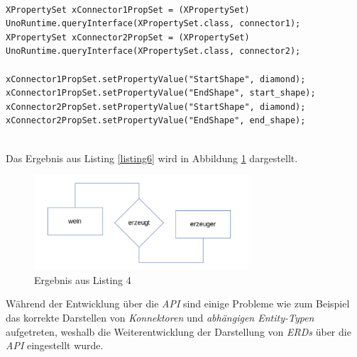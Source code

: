\noindent
\lstset{language=Java}
\lstset{frame=lines}
\lstset{basicstyle=\footnotesize}
\begin{lstlisting}

XPropertySet xConnector1PropSet = (XPropertySet) 
UnoRuntime.queryInterface(XPropertySet.class, connector1);
XPropertySet xConnector2PropSet = (XPropertySet) 
UnoRuntime.queryInterface(XPropertySet.class, connector2);

xConnector1PropSet.setPropertyValue("StartShape", diamond);
xConnector1PropSet.setPropertyValue("EndShape", start_shape);
xConnector2PropSet.setPropertyValue("StartShape", diamond);
xConnector2PropSet.setPropertyValue("EndShape", end_shape);

\end{lstlisting}
\noindent
\\
\noindent
Das Ergebnis aus Listing \ref{listing6} wird in Abbildung \ref{ergebnis6} dargestellt.
\begin{figure}[H]
	\centering
	\includegraphics[width=8cm]{images/11.png}
	\caption{Ergebnis aus Listing 4}
	\label{ergebnis6}
\end{figure}
\noindent
Während der Entwicklung über die \textit{API} sind einige Probleme wie zum Beispiel das korrekte Darstellen von \textit{Konnektoren} und \textit{abhängigen Entity-Typen} aufgetreten, weshalb die Weiterentwicklung der Darstellung von \textit{ERDs} über die \textit{API} eingestellt wurde.



